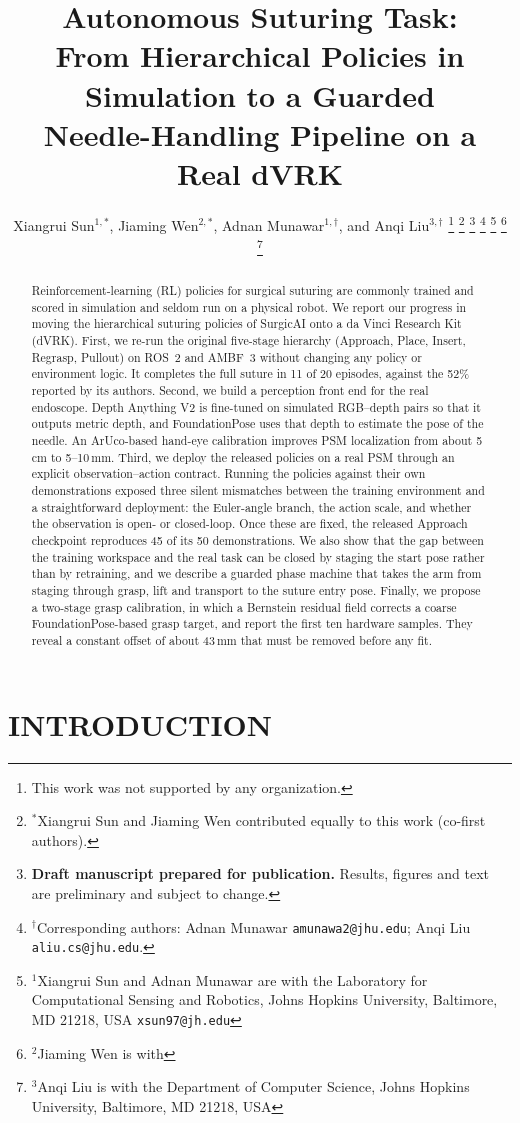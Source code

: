 \documentclass[letterpaper, 10 pt, conference]{ieeeconf}  %
\title{\LARGE \bf
Autonomous Suturing Task:\\
From Hierarchical Policies in Simulation to a Guarded\\
Needle-Handling Pipeline on a Real dVRK
}
\author{Xiangrui Sun$^{1,\ast}$, Jiaming Wen$^{2,\ast}$, Adnan Munawar$^{1,\dagger}$, and Anqi Liu$^{3,\dagger}$%
\thanks{This work was not supported by any organization.}%
\thanks{$^{\ast}$Xiangrui Sun and Jiaming Wen contributed equally to this work (co-first authors).}%
\thanks{\textbf{Draft manuscript prepared for publication.} Results, figures and text are
        preliminary and subject to change.}%
\thanks{$^{\dagger}$Corresponding authors: Adnan Munawar {\tt\small amunawa2@jhu.edu};
        Anqi Liu {\tt\small aliu.cs@jhu.edu}.}%
\thanks{$^{1}$Xiangrui Sun and Adnan Munawar are with the Laboratory for Computational
        Sensing and Robotics, Johns Hopkins University, Baltimore, MD 21218, USA
        {\tt\small xsun97@jh.edu}}%
\thanks{$^{2}$Jiaming Wen is with \todo{affiliation}
        {\tt\small \todo{email}}}%
\thanks{$^{3}$Anqi Liu is with the Department of Computer Science,
        Johns Hopkins University, Baltimore, MD 21218, USA}%
}
\begin{document}
\maketitle
\thispagestyle{empty}
\pagestyle{empty}


\begin{abstract}
Reinforcement-learning (RL) policies for surgical suturing are commonly trained
and scored in simulation and seldom run on a physical robot. We report our
progress in moving the hierarchical suturing policies of SurgicAI onto a da Vinci
Research Kit (dVRK). First, we re-run the original five-stage hierarchy
(Approach, Place, Insert, Regrasp, Pullout) on ROS~2 and AMBF~3 without changing
any policy or environment logic. It completes the full suture in 11 of 20
episodes, against the 52\% reported by its authors. Second, we build a perception
front end for the real endoscope. Depth Anything V2 is fine-tuned on simulated
RGB--depth pairs so that it outputs metric depth, and FoundationPose uses that
depth to estimate the pose of the needle. An ArUco-based hand-eye calibration
improves PSM localization from about 5\,cm to 5--10\,mm. Third, we deploy the
released policies on a real PSM through an explicit observation--action
contract. Running the policies against their own demonstrations exposed three
silent mismatches between the training environment and a straightforward
deployment: the Euler-angle branch, the action scale, and whether the
observation is open- or closed-loop. Once these are fixed, the released Approach
checkpoint reproduces 45 of its 50 demonstrations. We also show that the gap
between the training workspace and the real task can be closed by staging the
start pose rather than by retraining, and we describe a guarded phase machine
that takes the arm from staging through grasp, lift and transport to the suture
entry pose. Finally, we propose a two-stage grasp calibration, in which a
Bernstein residual field corrects a coarse FoundationPose-based grasp target,
and report the first ten hardware samples. They reveal a constant offset of
about 43\,mm that must be removed before any fit.
\end{abstract}


\section{INTRODUCTION}
\end{document}
